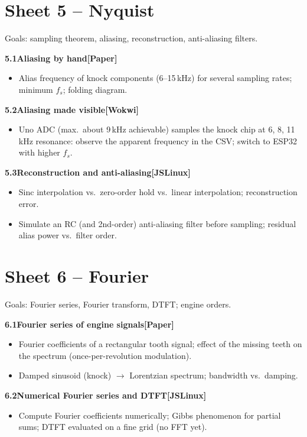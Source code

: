 \documentclass[11pt,a4paper]{article}
\newcommand{\W}{\textsf{\textbf{[Wokwi]}}}
\newcommand{\J}{\textsf{\textbf{[JSLinux]}}}
\newcommand{\Pap}{\textsf{\textbf{[Paper]}}}
\newcommand{\exercise}[4]{%
  \par\smallskip\noindent\textbf{#1\quad #2}\hfill#3\par
  \nopagebreak\begin{itemize}[leftmargin=1.2em]#4\end{itemize}}
\begin{document}
\section{Sheet 5 -- Nyquist}
\begin{sheetinfo}
Goals: sampling theorem, aliasing, reconstruction, anti-aliasing filters.
\end{sheetinfo}

\exercise{5.1}{Aliasing by hand}{\Pap}{
  \item Alias frequency of knock components (6--15\,kHz) for several
    sampling rates; minimum $f_s$; folding diagram.}

\exercise{5.2}{Aliasing made visible}{\W}{
  \item Uno ADC (max.\ about 9\,kHz achievable) samples the knock chip at
    6, 8, 11\,kHz resonance: observe the apparent frequency in the CSV;
    switch to ESP32 with higher $f_s$.}

\exercise{5.3}{Reconstruction and anti-aliasing}{\J}{
  \item Sinc interpolation vs.\ zero-order hold vs.\ linear interpolation;
    reconstruction error.
  \item Simulate an RC (and 2nd-order) anti-aliasing filter before
    sampling; residual alias power vs.\ filter order.}

\section{Sheet 6 -- Fourier}
\begin{sheetinfo}
Goals: Fourier series, Fourier transform, DTFT; engine orders.
\end{sheetinfo}

\exercise{6.1}{Fourier series of engine signals}{\Pap}{
  \item Fourier coefficients of a rectangular tooth signal; effect of the
    missing teeth on the spectrum (once-per-revolution modulation).
  \item Damped sinusoid (knock) $\rightarrow$ Lorentzian spectrum;
    bandwidth vs.\ damping.}

\exercise{6.2}{Numerical Fourier series and DTFT}{\J}{
  \item Compute Fourier coefficients numerically; Gibbs phenomenon for
    partial sums; DTFT evaluated on a fine grid (no FFT yet).}
\end{document}

